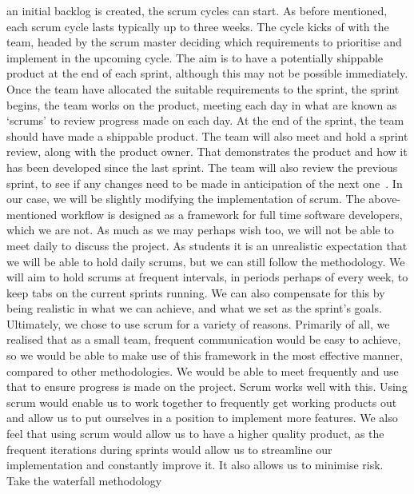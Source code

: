             an initial backlog is created, the scrum cycles can start. As before mentioned, each scrum cycle lasts
            typically up to three weeks. The cycle kicks of with the team, headed by the scrum master deciding which
            requirements to prioritise and implement in the upcoming cycle. The aim is to have a potentially shippable
            product at the end of each sprint, although this may not be possible immediately. Once the team have
            allocated the suitable requirements to the sprint, the sprint begins, the team works on the product, meeting
            each day in what are known as ‘scrums’ to review progress made on each day. At the end of the sprint, the
            team should have made a shippable product. The team will also meet and hold a sprint review, along with the
            product owner. That demonstrates the product and how it has been developed since the last sprint. The team
            will also review the previous sprint, to see if any changes need to be made in anticipation of the next
            one~\cite{nuevo_2011_scrumbased}. In our case, we will be slightly modifying the implementation of scrum.
            The above-mentioned workflow is designed as a framework for full time software developers, which we are not.
            As much as we may perhaps wish too, we will not be able to meet daily to discuss the project. As students it
            is an unrealistic expectation that we will be able to hold daily scrums, but we can still follow the
            methodology. We will aim to hold scrums at frequent intervals, in periods perhaps of every week, to keep
            tabs on the current sprints running. We can also compensate for this by being realistic in what we can
            achieve, and what we set as the sprint’s goals. Ultimately, we chose to use scrum for a variety of reasons.
            Primarily of all, we realised that as a small team, frequent communication would be easy to achieve, so we
            would be able to make use of this framework in the most effective manner, compared to other methodologies.
            We would be able to meet frequently and use that to ensure progress is made on the project. Scrum works well
            with this. Using scrum would enable us to work together to frequently get working products out and allow us
            to put ourselves in a position to implement more features. We also feel that using scrum would allow us to
            have a higher quality product, as the frequent iterations during sprints would allow us to streamline our
            implementation and constantly improve it. It also allows us to minimise risk. Take the waterfall methodology
